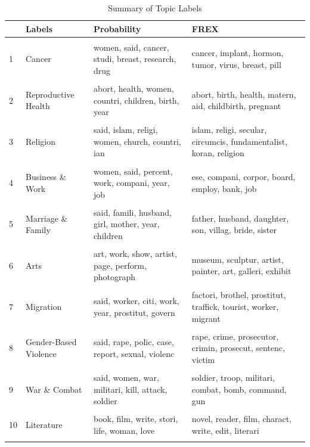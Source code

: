 \documentclass[11pt, oneside]{article}
\newcommand\T{\rule{0pt}{2.6ex}}       %
\newcommand\B{\rule[-1.2ex]{0pt}{0pt}} %
\begin{document}
\afterpage{\clearpage}
\begin{table}[!p]
\centering
\small
\caption{Summary of Topic Labels}\label{table:labels}
\begin{tabular}{p{.3cm} M{4cm} | M{5cm} | M{5 cm} }
  \hline \hspace{5}
 & Labels & Probability & FREX \T\B \\ 
  \hline \\
1 & Cancer & women, said, cancer, studi, breast, research, drug & cancer, implant, hormon, tumor, virus, breast, pill \\  &&&\\
  2 & Reproductive Health & abort, health, women, countri, children, birth, year & abort, birth, health, matern, aid, childbirth, pregnant \\ &&&\\
  3 & Religion & said, islam, religi, women, church, countri, ian & islam, religi, secular, circumcis, fundamentalist, koran, religion \\ &&&\\
  4 & Business \& Work & women, said, percent, work, compani, year, job & ese, compani, corpor, board, employ, bank, job \\ &&&\\
  5 & Marriage \& Family & said, famili, husband, girl, mother, year, children & father, husband, daughter, son, villag, bride, sister \\ &&&\\
  6 & Arts & art, work, show, artist, page, perform, photograph & museum, sculptur, artist, painter, art, galleri, exhibit \\ &&&\\
  7 & Migration & said, worker, citi, work, year, prostitut, govern & factori, brothel, prostitut, traffick, tourist, worker, migrant \\ &&&\\
  8 & Gender-Based Violence & said, rape, polic, case, report, sexual, violenc & rape, crime, prosecutor, crimin, prosecut, sentenc, victim \\ &&&\\
  9 & War \& Combat & said, women, war, militari, kill, attack, soldier & soldier, troop, militari, combat, bomb, command, gun \\ &&&\\
  10 & Literature & book, film, write, stori, life, woman, love & novel, reader, film, charact, write, edit, literari \\ &&&\\

\end{tabular}
\end{table}
\end{document}

